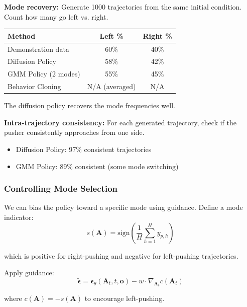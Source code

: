 \textbf{Mode recovery:} Generate 1000 trajectories from the same initial condition. Count how many go left vs. right.

\begin{center}
\begin{tabular}{lcc}
\toprule
\textbf{Method} & \textbf{Left \%} & \textbf{Right \%} \\
\midrule
Demonstration data & 60\% & 40\% \\
Diffusion Policy & 58\% & 42\% \\
GMM Policy (2 modes) & 55\% & 45\% \\
Behavior Cloning & N/A (averaged) & N/A \\
\bottomrule
\end{tabular}
\end{center}

The diffusion policy recovers the mode frequencies well.

\textbf{Intra-trajectory consistency:} For each generated trajectory, check if the pusher consistently approaches from one side.

\begin{itemize}
    \item Diffusion Policy: 97\% consistent trajectories
    \item GMM Policy: 89\% consistent (some mode switching)
\end{itemize}

\subsubsection{Controlling Mode Selection}

We can bias the policy toward a specific mode using guidance. Define a mode indicator:
\begin{equation}
s(\mathbf{A}) = \text{sign}\left(\frac{1}{H}\sum_{h=1}^{H} y_{p,h}\right)
\label{eq:mode_indicator}
\end{equation}

which is positive for right-pushing and negative for left-pushing trajectories.

Apply guidance:
\begin{equation}
\tilde{\boldsymbol{\epsilon}} = \boldsymbol{\epsilon}_\theta(\mathbf{A}_t, t, \mathbf{o}) - w \cdot \nabla_{\mathbf{A}_t} c(\mathbf{A}_t)
\label{eq:mode_guidance}
\end{equation}

where $c(\mathbf{A}) = -s(\mathbf{A})$ to encourage left-pushing.

